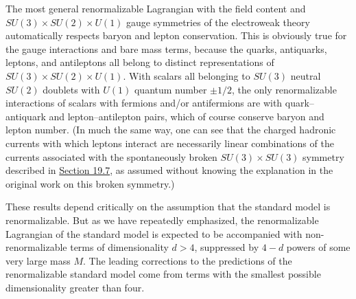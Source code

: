 The most general renormalizable Lagrangian with the field content and $SU(3)\times SU(2)\times U(1)$ gauge symmetries of the electroweak theory automatically respects baryon and lepton conservation. This is obviously true for the gauge interactions and bare mass terms, because the quarks, antiquarks, leptons, and antileptons all belong to distinct representations of $SU(3)\times SU(2)\times U(1)$. With scalars all belonging to $SU(3)$ neutral $SU(2)$ doublets with $U(1)$ quantum number $\mathbin{\pm}1/2$, the only renormalizable interactions of scalars with fermions and/or antifermions are with quark--antiquark and lepton--antilepton pairs, which of course conserve baryon and lepton number. (In much the same way, one can see that the charged hadronic currents with which leptons interact are necessarily linear combinations of the currents associated with the spontaneously broken $SU(3)\times SU(3)$ symmetry described in \hyperref[sec:19.7]{Section 19.7}, as assumed without knowing the explanation in the original work on this broken symmetry.)

These results depend critically on the assumption that the standard model is renormalizable. But as we have repeatedly emphasized, the renormalizable Lagrangian of the standard model is expected to be accompanied with non-renormalizable terms of dimensionality $d>4$, suppressed by $4-d$ powers of some very large mass $M$. The leading corrections to the predictions of the renormalizable standard model come from terms with the smallest possible dimensionality greater than four.


